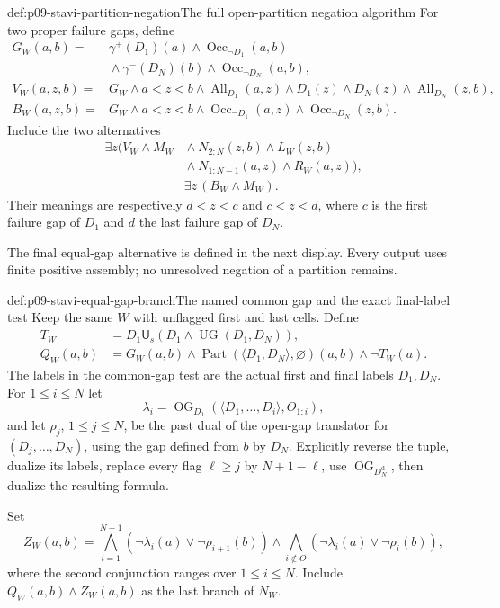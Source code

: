 \begin{hbdefinition}{def:p09-stavi-partition-negation}{The full open-partition negation algorithm}
For two proper failure gaps, define
\[
\begin{split}
 G_W(a,b)={}&
 \gamma^+(D_1)(a)\land\operatorname{Occ}_{\neg D_1}(a,b)\\
 &{}\land\gamma^-(D_N)(b)\land\operatorname{Occ}_{\neg D_N}(a,b),\\
 V_W(a,z,b)={}&G_W\land a<z<b
       \land\operatorname{All}_{D_1}(a,z)\land D_1(z)
       \land D_N(z)\land\operatorname{All}_{D_N}(z,b),\\
 B_W(a,z,b)={}&G_W\land a<z<b
       \land\operatorname{Occ}_{\neg D_1}(a,z)
       \land\operatorname{Occ}_{\neg D_N}(z,b).
\end{split}
\]
Include the two alternatives
\[
\begin{split}
 \exists z\bigl(V_W\land M_W
       &{}\land N_{2:N}(z,b)\land L_W(z,b)\\
       &{}\land N_{1:N-1}(a,z)\land R_W(a,z)\bigr),\\
 &\exists z\,(B_W\land M_W).
\end{split}
\]
Their meanings are respectively \(d<z<c\)
and \(c<z<d\), where \(c\) is the first
failure gap of \(D_1\) and \(d\) the last
failure gap of \(D_N\).

The final equal-gap alternative is defined
in the next display. Every output uses
finite positive assembly; no unresolved
negation of a partition remains.
\end{hbdefinition}

\begin{hbdefinition}{def:p09-stavi-equal-gap-branch}{The named common gap and the exact final-label test}
Keep the same \(W\) with unflagged
first and last cells. Define
\[
\begin{aligned}
 T_W&=D_1\mathbin{\mathsf U_s}
                   (D_1\land\operatorname{UG}(D_1,D_N)),\\
 Q_W(a,b)&=
 G_W(a,b)\land
 \operatorname{Part}(\langle D_1,D_N\rangle,\varnothing)(a,b)
                                                  \land\neg T_W(a).
\end{aligned}
\]
The labels in the common-gap test are the
actual first and final labels \(D_1,D_N\).
For \(1\leq i\leq N\) let
\[
 \lambda_i=\operatorname{OG}_{D_1}
                        (\langle D_1,\ldots,D_i\rangle,O_{1:i}),
\]
and let \(\rho_j\), \(1\leq j\leq N\),
be the past dual of the open-gap translator
for \((D_j,\ldots,D_N)\), using the
gap defined from \(b\) by \(D_N\).
Explicitly reverse the tuple, dualize
its labels, replace every flag \(\ell\geq j\)
by \(N+1-\ell\), use
\(\operatorname{OG}_{D_N^{\mathrm d}}\),
then dualize the resulting formula.

Set
\[
 Z_W(a,b)=
 \bigwedge_{i=1}^{N-1}
              (\neg\lambda_i(a)\lor\neg\rho_{i+1}(b))
 \land
 \bigwedge_{i\notin O}
              (\neg\lambda_i(a)\lor\neg\rho_i(b)),
\]
where the second conjunction ranges over
\(1\leq i\leq N\). Include
\(Q_W(a,b)\land Z_W(a,b)\) as the
last branch of \(N_W\).
\end{hbdefinition}

